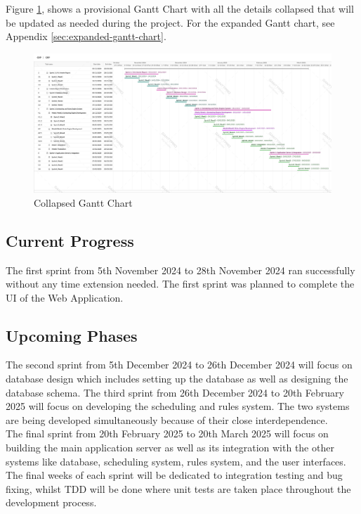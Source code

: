 \documentclass[a4paper,12pt, oneside]{report}
\begin{document}
Figure \ref{fig:collapsed-gantt-chart}, shows a provisional Gantt Chart with all the details collapsed that will be updated as needed during the project. For the expanded Gantt chart, see Appendix \ref{sec:expanded-gantt-chart}. \\

\begin{figure}[H]
   \centering
    \includegraphics[width=\linewidth]{GanttCharts/GRP_GanttChart_Collapsed.png}
    \caption{Collapsed Gantt Chart}
    \label{fig:collapsed-gantt-chart}
\end{figure}


\subsection{Current Progress}
The first sprint from 5th November 2024 to 28th November 2024 ran successfully without any time extension needed. The first sprint was planned to complete the UI of the Web Application.\\

\subsection{Upcoming Phases}
The second sprint from 5th December 2024 to 26th December 2024 will focus on database design which includes setting up the database as well as designing the database schema. The third sprint from 26th December 2024 to 20th February 2025 will focus on developing the scheduling and rules system. The two systems are being developed simultaneously because of their close interdependence.\\

The final sprint from 20th February 2025 to 20th March 2025 will focus on building the main application server as well as its integration with the other systems like database, scheduling system, rules system, and the user interfaces. The final weeks of each sprint will be dedicated to integration testing and bug fixing, whilst TDD will be done where unit tests are taken place throughout the development process.\\
\end{document}
